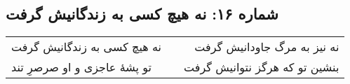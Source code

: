 \begin{center}
\section*{شماره ۱۶: نه هیچ کسی به زندگانیش گرفت}
\label{sec:016}
\begin{longtable}{l p{0.5cm} r}
نه هیچ کسی به زندگانیش گرفت
&&
نه نیز به مرگ جاودانیش گرفت
\\
تو پشهٔ عاجزی و او صرصرِ تند
&&
بنشین تو که هرگز نتوانیش گرفت
\\
\end{longtable}
\end{center}
